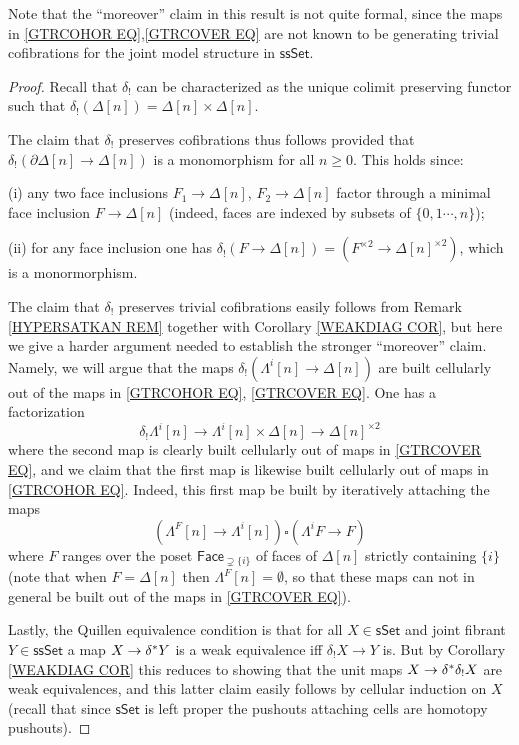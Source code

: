 \documentclass[a4paper,10pt,draft]{article}%
\begin{document}
Note that the ``moreover'' claim in this result is not quite formal, since the maps in \eqref{GTRCOHOR EQ},\eqref{GTRCOVER EQ} are not known to be generating trivial cofibrations for the joint model structure in $\mathsf{ssSet}$.


\begin{proof}
	Recall that $\delta_!$ can be characterized as the unique colimit preserving functor such that 
	$\delta_!(\Delta[n])=\Delta[n] \times \Delta[n]$.

	The claim that $\delta_!$ preserves cofibrations thus follows provided that 
	$\delta_{!}\left( \partial \Delta[n] \to \Delta[n]\right)$
	is a monomorphism for all $n\geq 0$.
	This holds since:
	\begin{inparaenum}
		\item[(i)] any two face inclusions $F_1 \to \Delta[n]$, $F_2 \to \Delta[n]$ factor through a minimal face inclusion $F \to \Delta[n]$ (indeed, faces are indexed by subsets of $\{0,1\cdots,n\}$); 
		\item[(ii)] for any face inclusion one has 
		$\delta_{!}\left( F \to \Delta[n]\right) = 
		\left(F^{\times 2} \to \Delta[n]^{\times 2} \right)$, which is a monormorphism.
	\end{inparaenum}

The claim that $\delta_!$ preserves trivial cofibrations easily follows from Remark \ref{HYPERSATKAN REM} together with Corollary \ref{WEAKDIAG COR}, but here we give a harder argument needed to establish the stronger ``moreover'' claim.
Namely, we will argue that the maps
$\delta_! \left( \Lambda^i[n] \to \Delta[n]\right)$
are built cellularly out of the maps in 
\eqref{GTRCOHOR EQ}, \eqref{GTRCOVER EQ}.
One has a factorization
\[
	\delta_! \Lambda^i[n] \to
	\Lambda^i[n] \times \Delta[n] \to \Delta[n]^{\times 2}
\]
where the second map is clearly built cellularly out of maps in 
\eqref{GTRCOVER EQ}, and we claim that 
the first map is likewise built cellularly out of maps in \eqref{GTRCOHOR EQ}.
Indeed, this first map be built by iteratively attaching the maps
\[
	\left(\Lambda^{F}[n] \to \Lambda^i[n] \right)
		\square
	\left(\Lambda^{i}F \to F \right)
\]
where $F$ ranges over the poset $\mathsf{Face}_{\supsetneq \{i\}}$
of faces of $\Delta[n]$ strictly containing $\{i\}$ 
(note that when $F=\Delta[n]$ then $\Lambda^F[n]=\emptyset$, so that these maps can not in general be built out of the maps in \eqref{GTRCOVER EQ}). 

Lastly, the Quillen equivalence condition 
is that for all $X \in \mathsf{sSet}$ and joint fibrant
$Y \in \mathsf{ssSet}$ a map
$X \to \delta^{\**} Y$ is a weak equivalence iff 
$\delta_!X \to Y$ is. 
But by Corollary \ref{WEAKDIAG COR}
this reduces to showing
that the unit maps $X \to \delta^{\**} \delta_! X$
are weak equivalences, and this latter claim easily follows by cellular induction on $X$
(recall that since $\mathsf{sSet}$ is left proper the pushouts attaching cells are homotopy pushouts).
\end{proof}
\end{document}
